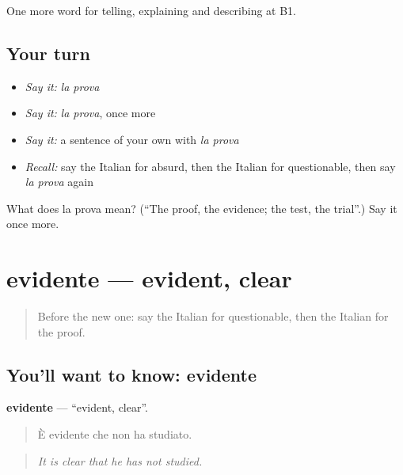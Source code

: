 \begin{grammarlens}[title={What you've built}]
One more word for telling, explaining and describing at B1.
\end{grammarlens}

\subsection*{Your turn}
\begin{itemize}
\raggedright
  \item \emph{Say it:} \emph{la prova}
  \item \emph{Say it:} \emph{la prova}, once more
  \item \emph{Say it:} a sentence of your own with \emph{la prova}
  \item \emph{Recall:} say the Italian for absurd, then the Italian for questionable, then say \emph{la prova} again
\end{itemize}

\begin{tcolorbox}[breakable,colback=teal!4,colframe=teal!35!black,title={Before you move on}]
What does la prova mean? (\textquotedblleft{}The proof, the evidence; the test, the trial\textquotedblright{}.) Say it once more.
\end{tcolorbox}
\section[evidente]{evidente — evident, clear}

\label{lesson:IT-C344-evidente}



\begin{quote}
Before the new one: say the Italian for questionable, then the Italian for the proof.
\end{quote}

\subsection*{You'll want to know: evidente}
\textbf{evidente} — \textquotedblleft{}evident, clear\textquotedblright{}.

\begin{quote}
È evidente che non ha studiato.
\end{quote}

\begin{quote}
\emph{It is clear that he has not studied.}
\end{quote}

